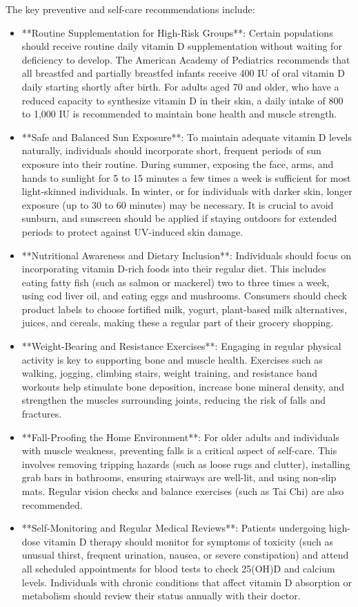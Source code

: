The key preventive and self-care recommendations include:
\begin{itemize}
    \item **Routine Supplementation for High-Risk Groups**: Certain populations should receive routine daily vitamin D supplementation without waiting for deficiency to develop. The American Academy of Pediatrics recommends that all breastfed and partially breastfed infants receive 400 IU of oral vitamin D daily starting shortly after birth. For adults aged 70 and older, who have a reduced capacity to synthesize vitamin D in their skin, a daily intake of 800 to 1,000 IU is recommended to maintain bone health and muscle strength.
    \item **Safe and Balanced Sun Exposure**: To maintain adequate vitamin D levels naturally, individuals should incorporate short, frequent periods of sun exposure into their routine. During summer, exposing the face, arms, and hands to sunlight for 5 to 15 minutes a few times a week is sufficient for most light-skinned individuals. In winter, or for individuals with darker skin, longer exposure (up to 30 to 60 minutes) may be necessary. It is crucial to avoid sunburn, and sunscreen should be applied if staying outdoors for extended periods to protect against UV-induced skin damage.
    \item **Nutritional Awareness and Dietary Inclusion**: Individuals should focus on incorporating vitamin D-rich foods into their regular diet. This includes eating fatty fish (such as salmon or mackerel) two to three times a week, using cod liver oil, and eating eggs and mushrooms. Consumers should check product labels to choose fortified milk, yogurt, plant-based milk alternatives, juices, and cereals, making these a regular part of their grocery shopping.
    \item **Weight-Bearing and Resistance Exercises**: Engaging in regular physical activity is key to supporting bone and muscle health. Exercises such as walking, jogging, climbing stairs, weight training, and resistance band workouts help stimulate bone deposition, increase bone mineral density, and strengthen the muscles surrounding joints, reducing the risk of falls and fractures.
    \item **Fall-Proofing the Home Environment**: For older adults and individuals with muscle weakness, preventing falls is a critical aspect of self-care. This involves removing tripping hazards (such as loose rugs and clutter), installing grab bars in bathrooms, ensuring stairways are well-lit, and using non-slip mats. Regular vision checks and balance exercises (such as Tai Chi) are also recommended.
    \item **Self-Monitoring and Regular Medical Reviews**: Patients undergoing high-dose vitamin D therapy should monitor for symptoms of toxicity (such as unusual thirst, frequent urination, nausea, or severe constipation) and attend all scheduled appointments for blood tests to check 25(OH)D and calcium levels. Individuals with chronic conditions that affect vitamin D absorption or metabolism should review their status annually with their doctor.
\end{itemize}

